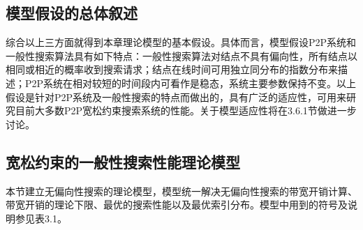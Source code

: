 \subsection{模型假设的总体叙述}

综合以上三方面就得到本章理论模型的基本假设。具体而言，模型假设P2P系统和一般性搜索算法具有如下特点：一般性搜索算法对结点不具有偏向性，所有结点以相同或相近的概率收到搜索请求；结点在线时间可用独立同分布的指数分布来描述；P2P系统在相对较短的时间段内可看作是稳态，系统主要参数保持不变。以上假设是针对P2P系统及一般性搜索的特点而做出的，具有广泛的适应性，可用来研究目前大多数P2P宽松约束搜索系统的性能。关于模型适应性将在3.6.1节做进一步讨论。

\subsection{宽松约束的一般性搜索性能理论模型}

本节建立无偏向性搜索的理论模型，模型统一解决无偏向性搜索的带宽开销计算、带宽开销的理论下限、最优的搜索性能以及最优索引分布。模型中用到的符号及说明参见表3.1。


